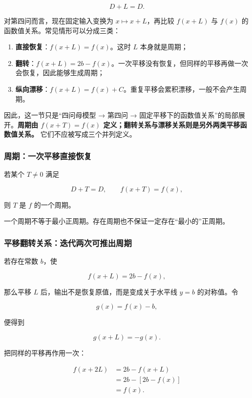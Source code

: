 \documentclass[11pt,a4paper]{ctexart}
\providecommand{\tightlist}{}
\begin{document}
\[
D+L=D.
\]

对第四问而言，现在固定输入变换为 \(x\mapsto x+L\)，再比较 \(f(x+L)\) 与 \(f(x)\) 的函数值关系。常见情形可以分成三类：

\begin{enumerate}
\tightlist
\item
  \textbf{直接恢复}：\(f(x+L)=f(x)\)。这时 \(L\) 本身就是周期；
\item
  \textbf{翻转}：\(f(x+L)=2b-f(x)\)。一次平移没有恢复，但同样的平移再做一次会恢复，因此能够生成周期；
\item
  \textbf{纵向漂移}：\(f(x+L)=f(x)+C\)。重复平移会累积漂移，一般不会产生周期。
\end{enumerate}

因此，这一节只是“四问母模型 → 第四问 → 固定平移下的函数值关系”的局部展开。\textbf{周期由 \(f(x+T)=f(x)\) 定义；翻转关系与漂移关系则是另外两类平移函数值关系。} 它们不应被写成三个并列定义。

\subsubsection{周期：一次平移直接恢复}\label{ux5468ux671f}

若某个 \(T\ne0\) 满足

\[
D+T=D,
\qquad
\boxed{f(x+T)=f(x)},
\]

则 \(T\) 是 \(f\) 的一个周期。

一个周期不等于最小正周期。存在周期也不保证一定存在``最小的''正周期。

\subsubsection{平移翻转关系：迭代两次可推出周期}\label{ux5e73ux79fbux7ffbux8f6c}

若存在常数 \(b\)，使

\[
\boxed{f(x+L)=2b-f(x)},
\]

那么平移 \(L\) 后，输出不是恢复原值，而是变成关于水平线 \(y=b\) 的对称值。令

\[
g(x)=f(x)-b,
\]

便得到

\[
g(x+L)=-g(x).
\]

把同样的平移再作用一次：

\[
\begin{aligned}
f(x+2L)
&=2b-f(x+L)\\
&=2b-[2b-f(x)]\\
&=f(x).
\end{aligned}
\]
\end{document}
